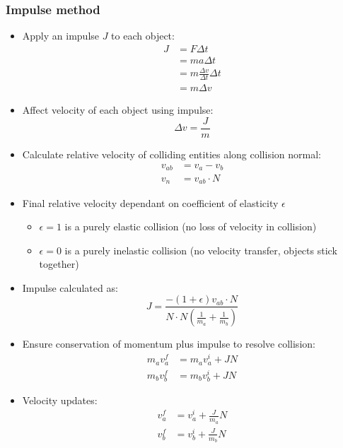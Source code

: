\documentclass[a4paper]{article}
\begin{document}
\subsubsection{Impulse method}

\begin{itemize}
  \item
    Apply an impulse $J$ to each object:
    \begin{align*}
      J &= F \Delta t \\
        &= ma \Delta t \\
        &= m \frac{\Delta v}{\Delta t} \Delta t \\
        &= m \Delta v
    \end{align*}

  \item
    Affect velocity of each object using impulse:
    \[
      \Delta v = \frac{J}{m}
    \]

\end{itemize}


\begin{itemize}
  \item
    Calculate relative velocity of colliding entities along collision normal:
    \begin{align*}
      v_{ab} &= v_{a} - v_{b} \\
      v_{n} &= v_{ab} \cdot N
    \end{align*}

  \item
    Final relative velocity dependant on coefficient of elasticity $\epsilon$
    \begin{itemize}
      \item
        $\epsilon = 1$ is a purely elastic collision (no loss of velocity in
        collision)

      \item
        $\epsilon = 0$ is a purely inelastic collision (no velocity transfer,
        objects stick together)

    \end{itemize}

  \item
    Impulse calculated as:
    \[
      J = \frac{-(1 + \epsilon) v_{ab} \cdot N}
               {N \cdot N\left(\frac{1}{m_{a}} + \frac{1}{m_{b}}\right)}
    \]

  \item
    Ensure conservation of momentum plus impulse to resolve collision:
    \begin{align*}
      m_{a}v_{a}^{f} &= m_{a}v_{a}^{i} + J N \\
      m_{b}v_{b}^{f} &= m_{b}v_{b}^{i} + J N
    \end{align*}

  \item
    Velocity updates:
    \begin{align*}
      v_{a}^{f} &= v_{a}^{i} + \frac{J}{m_{a}} N \\
      v_{b}^{f} &= v_{b}^{i} + \frac{J}{m_{b}} N
    \end{align*}

\end{itemize}
\end{document}
